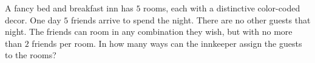 A fancy bed and breakfast inn has $5$ rooms, each with a distinctive color-coded decor. One day $5$ friends arrive to spend the night. There are no other guests that night. The friends can room in any combination they wish, but with no more than $2$ friends per room. In how many ways can the innkeeper assign the guests to the rooms?
